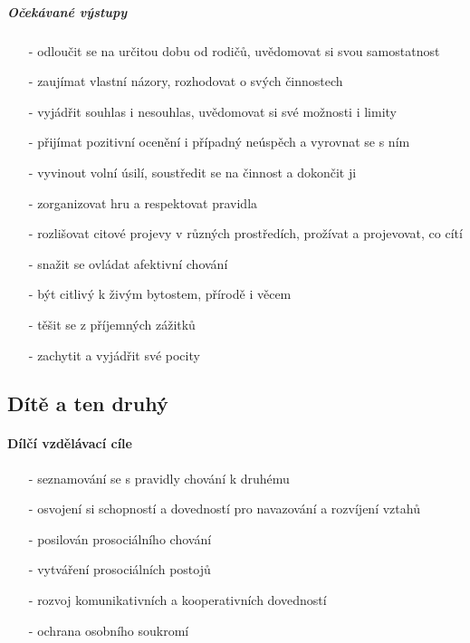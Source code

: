 					\subparagraph{Očekávané výstupy}

					\begin{itemize}
					\setlength\itemsep{-2mm}
						\item[-]odloučit se na určitou dobu od rodičů, uvědomovat si svou samostatnost
						\item[-]zaujímat vlastní názory, rozhodovat o svých činnostech
						\item[-]vyjádřit souhlas i nesouhlas, uvědomovat si své možnosti i limity
						\item[-]přijímat pozitivní ocenění i případný neúspěch a vyrovnat se s ním
						\item[-]vyvinout volní úsilí, soustředit se na činnost a dokončit ji
						\item[-]zorganizovat hru a respektovat pravidla
						\item[-]rozlišovat citové projevy v různých prostředích, prožívat a projevovat, co cítí
						\item[-]snažit se ovládat afektivní chování
						\item[-]být citlivý k živým bytostem, přírodě i věcem
						\item[-]těšit se z příjemných zážitků
						\item[-]zachytit a vyjádřit své pocity
					\end{itemize}

			\subsection{Dítě a ten druhý}
				\textit{} \citep[s.~24]{RVP}

					\paragraph{Dílčí vzdělávací cíle}

					\begin{itemize}
					\setlength\itemsep{-2mm}
						\item[-]seznamování se s pravidly chování k druhému
						\item[-]osvojení si schopností a dovedností pro navazování a rozvíjení vztahů
						\item[-]posilován prosociálního chování
						\item[-]vytváření prosociálních postojů
						\item[-]rozvoj komunikativních a kooperativních dovedností
						\item[-]ochrana osobního soukromí
					\end{itemize}
					
